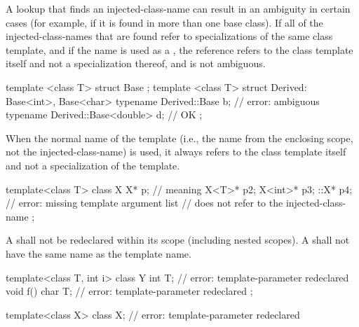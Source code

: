 \pnum
A lookup that finds an injected-class-name can result in an ambiguity in
certain cases (for example, if it is found in more than one
base class).
If all of the injected-class-names that are
found refer to specializations of the same class template,
and if the name
is used as a ,
the reference refers to the class template itself and not a
specialization thereof, and is not ambiguous.
\begin{example}
\begin{codeblock}
template <class T> struct Base { };
template <class T> struct Derived: Base<int>, Base<char> {
  typename Derived::Base b;             // error: ambiguous
  typename Derived::Base<double> d;     // OK
};
\end{codeblock}
\end{example}

\pnum
When the normal name of the template (i.e., the name from
the enclosing scope, not the injected-class-name) is
used,
it always refers to the class template itself and not a
specialization of the template.
\begin{example}
\begin{codeblock}
template<class T> class X {
  X* p;                                 // meaning 
  X<T>* p2;
  X<int>* p3;
  ::X* p4;                              // error: missing template argument list
                                        //  does not refer to the injected-class-name
};
\end{codeblock}
\end{example}

\pnum
A
shall not be redeclared within its scope (including nested scopes).
A
shall not have the same name as the template name.
\begin{example}
\begin{codeblock}
template<class T, int i> class Y {
  int T;                                // error: template-parameter redeclared
  void f() {
    char T;                             // error: template-parameter redeclared
  }
};

template<class X> class X;              // error: template-parameter redeclared
\end{codeblock}
\end{example}

